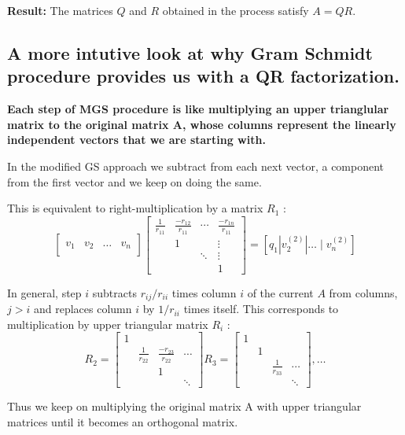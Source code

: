 \textbf{Result:} The matrices $Q$ and $R$ obtained in the process satisfy $A = QR$.

\subsection{A more intutive look at why Gram Schmidt procedure provides us with a QR factorization.}

\textbf{Each step of MGS procedure is like multiplying an upper trianglular matrix to the original matrix A, whose columns represent the linearly independent vectors that we are starting with.}


In the modified GS approach we subtract from each next vector, a component from the first vector and we keep on doing the same.

This is equivalent to right-multiplication by a matrix $R_1$ :
$$
\left[\begin{array}{l|l|l|l} 
& & & \\
v_1 & v_2 & \ldots & v_n \\
& & &
\end{array}\right]\left[\begin{array}{cccc}
\frac{1}{r_{11}} & \frac{-r_{12}}{r_{11}} & \cdots & \frac{-r_{1 n}}{r_{11}} \\
& 1 & & \vdots \\
& & \ddots & \vdots \\
& & & 1
\end{array}\right]=\left[q_1\left|v_2^{(2)}\right| \ldots \mid v_n^{(2)}\right]
$$

In general, step $i$ subtracts $r_{i j} / r_{i i}$ times column $i$ of the current $A$ from columns, $j>i$ and replaces column $i$ by $1 / r_{i i}$ times itself. This corresponds to multiplication by upper triangular matrix $R_i$ :
$$
R_2=\left[\begin{array}{cccc}
1 & & & \\
& \frac{1}{r_{22}} & \frac{-r_{23}}{r_{22}} & \cdots \\
& & 1 & \\
& & & \ddots
\end{array}\right] R_3=\left[\begin{array}{cccc}
1 & & & \\
& 1 & & \\
& & \frac{1}{r_{33}} & \cdots \\
& & & \ddots
\end{array}\right], \ldots
$$


Thus we keep on multiplying the original matrix A with upper triangular matrices until it becomes an orthogonal matrix. 



